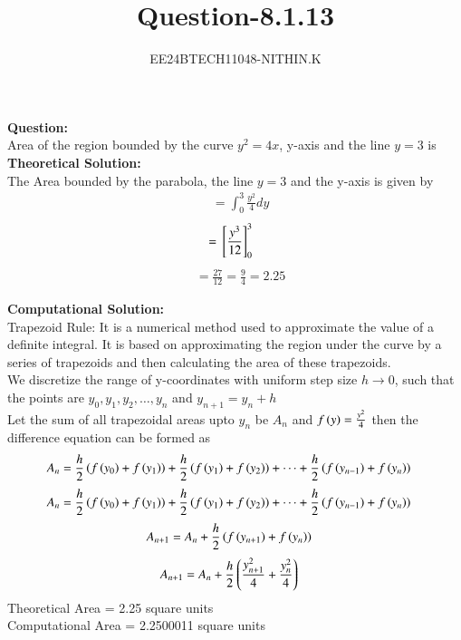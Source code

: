 \documentclass[journal]{IEEEtran}
\numberwithin{equation}{enumi}
\numberwithin{figure}{enumi}
\begin{document}


\title{Question-8.1.13}
\author{EE24BTECH11048-NITHIN.K} 
{\let\newpage\relax\maketitle}
\textbf{Question:} \\
Area of the region bounded by the curve $y^2 = 4x$, y-axis and the line $y = 3$ is \\

\textbf{Theoretical Solution:} \\
The Area bounded by the parabola, the line $y = 3$ and the y-axis is given by
\begin{align}
	&= \int_{0}^{3} \frac{y^2}{4}dy
\end{align}
\begin{align}
	&= {}\left[\frac{y^3}{12}\right]_{0}^{3}
\end{align}
\begin{align}
	&= \frac{27}{12} = \frac{9}{4} = 2.25
\end{align}

\textbf{Computational Solution:} \\
Trapezoid Rule: It is a numerical method used to approximate the value of a definite integral. It is based on approximating the region under the curve by a series of trapezoids and then calculating the area of these trapezoids. \\
We discretize the range of y-coordinates with uniform step size $h \to 0$, such that the points are $y_0, y_1, y_2, \dots ,y_n$ and $y_{n+1} = y_n + h$ \\
Let the sum of all trapezoidal areas upto $y_n$ be $A_n$ and $f\left(y\right) = \frac{y^2}{4}$ then the difference equation can be formed as \\
\begin{align}
	A_n &= \frac{h}{2}\left(f\left(y_0\right) + f\left(y_1\right)\right) + \frac{h}{2}\left(f\left(y_1\right) + f\left(y_2\right)\right) + \dots + \frac{h}{2}\left(f\left(y_{n-1}\right) + f\left(y_{n}\right)\right)
\end{align}
\begin{align}
	A_n &= \frac{h}{2}\left(f\left(y_0\right) + f\left(y_1\right)\right) + \frac{h}{2}\left(f\left(y_1\right) + f\left(y_2\right)\right) + \dots + \frac{h}{2}\left(f\left(y_{n - 1}\right) + f\left(y_{n}\right)\right)
\end{align}
\begin{align}
	A_{n+1} &= A_n + \frac{h}{2}\left(f\left(y_{n+1}\right) + f\left(y_n\right)\right)
\end{align}
\begin{align}
	A_{n+1} &= A_n + \frac{h}{2}\left(\frac{y_{n+1}^2}{4} + \frac{y_n^2}{4}\right)
\end{align}
Theoretical Area = 2.25 square units\\
Computational Area = 2.2500011 square units
\end{document}
